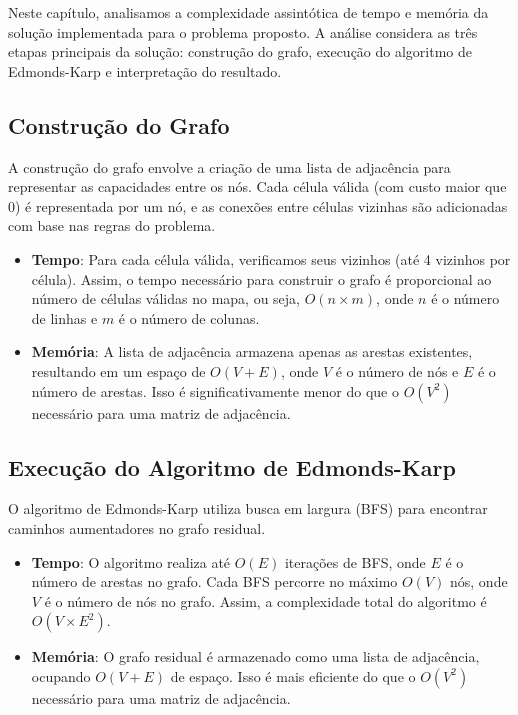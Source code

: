\documentclass[a4paper,12pt]{article}
\begin{document}
Neste capítulo, analisamos a complexidade assintótica de tempo e memória da
solução implementada para o problema proposto. A análise considera as três
etapas principais da solução: construção do grafo, execução do algoritmo de
Edmonds-Karp e interpretação do resultado.

\subsection*{Construção do Grafo}

A construção do grafo envolve a criação de uma lista de adjacência para representar as capacidades entre os nós. Cada célula válida (com custo maior que 0) é representada por um nó, e as conexões entre células vizinhas são adicionadas com base nas regras do problema.

\begin{itemize}
    \item \textbf{Tempo}: Para cada célula válida, verificamos seus vizinhos (até 4 vizinhos por célula). Assim, o tempo necessário para construir o grafo é proporcional ao número de células válidas no mapa, ou seja, $O(n \times m)$, onde $n$ é o número de linhas e $m$ é o número de colunas.
    \item \textbf{Memória}: A lista de adjacência armazena apenas as arestas existentes, resultando em um espaço de $O(V + E)$, onde $V$ é o número de nós e $E$ é o número de arestas. Isso é significativamente menor do que o $O(V^2)$ necessário para uma matriz de adjacência.
\end{itemize}

\subsection*{Execução do Algoritmo de Edmonds-Karp}

O algoritmo de Edmonds-Karp utiliza busca em largura (BFS) para encontrar caminhos aumentadores no grafo residual.

\begin{itemize}
    \item \textbf{Tempo}: O algoritmo realiza até $O(E)$ iterações de BFS, onde $E$ é o número de arestas no grafo. Cada BFS percorre no máximo $O(V)$ nós, onde $V$ é o número de nós no grafo. Assim, a complexidade total do algoritmo é $O(V \times E^2)$.
    \item \textbf{Memória}: O grafo residual é armazenado como uma lista de adjacência, ocupando $O(V + E)$ de espaço. Isso é mais eficiente do que o $O(V^2)$ necessário para uma matriz de adjacência.
\end{itemize}
\end{document}
